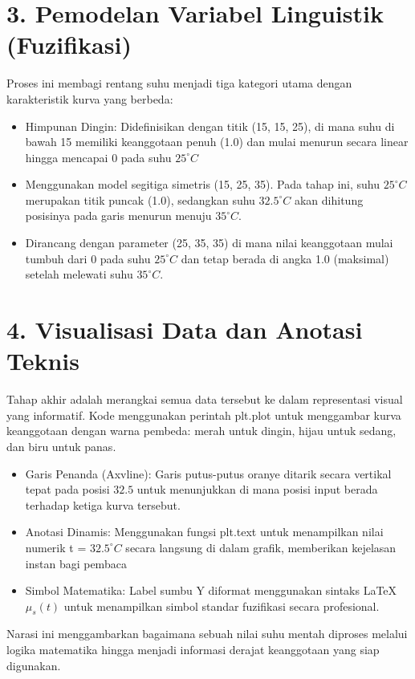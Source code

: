 \documentclass{article}
\begin{document}
\section*{3. Pemodelan Variabel Linguistik (Fuzifikasi)}
Proses ini membagi rentang suhu menjadi tiga kategori utama dengan karakteristik kurva yang berbeda:
\begin{itemize}
    \item Himpunan Dingin: Didefinisikan dengan titik (15, 15, 25), di mana suhu di bawah 15 memiliki keanggotaan penuh (1.0) dan mulai menurun secara linear hingga mencapai 0 pada suhu $25^\circ C$
    \item Menggunakan model segitiga simetris (15, 25, 35). Pada tahap ini, suhu $25^\circ C$ merupakan titik puncak (1.0), sedangkan suhu $32.5^\circ C$ akan dihitung posisinya pada garis menurun menuju $35^\circ C$.
    \item Dirancang dengan parameter (25, 35, 35) di mana nilai keanggotaan mulai tumbuh dari 0 pada suhu $25^\circ C$ dan tetap berada di angka 1.0 (maksimal) setelah melewati suhu $35^\circ C$.
\end{itemize}

\section*{4. Visualisasi Data dan Anotasi Teknis}
Tahap akhir adalah merangkai semua data tersebut ke dalam representasi visual yang informatif. Kode menggunakan perintah plt.plot untuk menggambar kurva keanggotaan dengan warna pembeda: merah untuk dingin, hijau untuk sedang, dan biru untuk panas.
\begin{itemize}
    \item Garis Penanda (Axvline): Garis putus-putus oranye ditarik secara vertikal tepat pada posisi $32.5$ untuk menunjukkan di mana posisi input berada terhadap ketiga kurva tersebut.
    \item Anotasi Dinamis: Menggunakan fungsi plt.text untuk menampilkan nilai numerik t = $32.5^\circ C$ secara langsung di dalam grafik, memberikan kejelasan instan bagi pembaca
    \item Simbol Matematika: Label sumbu Y diformat menggunakan sintaks LaTeX $\mu_s(t)$ untuk menampilkan simbol standar fuzifikasi secara profesional.
\end{itemize}
Narasi ini menggambarkan bagaimana sebuah nilai suhu mentah diproses melalui logika matematika hingga menjadi informasi derajat keanggotaan yang siap digunakan.
\end{document}
